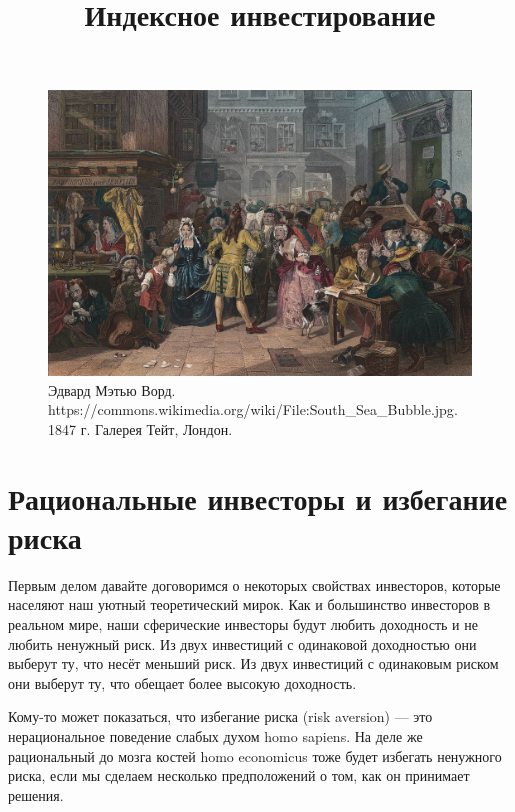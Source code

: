 
\title{Индексное инвестирование}



\maketitle
\thispagestyle{empty}

\begin{figure}[h]
\centering
\includegraphics[width=\textwidth]{south_sea_bubble.jpg}
\captionsetup{labelformat=empty}
\caption{\small{
Эдвард Мэтью Ворд. 
{https://commons.wikimedia.org/wiki/File:South_Sea_Bubble.jpg}.
1847 г. Галерея Тейт, Лондон.
}}
\end{figure}
\setcounter{figure}{0}
\newpage

\section*{Рациональные инвесторы и избегание риска}

Первым делом давайте договоримся о некоторых свойствах инвесторов, которые населяют
наш уютный теоретический мирок. Как и большинство инвесторов в реальном мире, наши
сферические инвесторы будут любить доходность и не любить ненужный риск. Из двух
инвестиций с одинаковой доходностью они выберут ту, что несёт меньший риск. Из
двух инвестиций с одинаковым риском они выберут ту,  что обещает более высокую доходность.

Кому-то может показаться, что избегание риска (risk aversion) --- это нерациональное поведение слабых духом
 homo sapiens. На деле же рациональный до мозга костей homo economicus тоже будет избегать ненужного
 риска, если мы сделаем несколько предположений о том, как он принимает решения.
 
